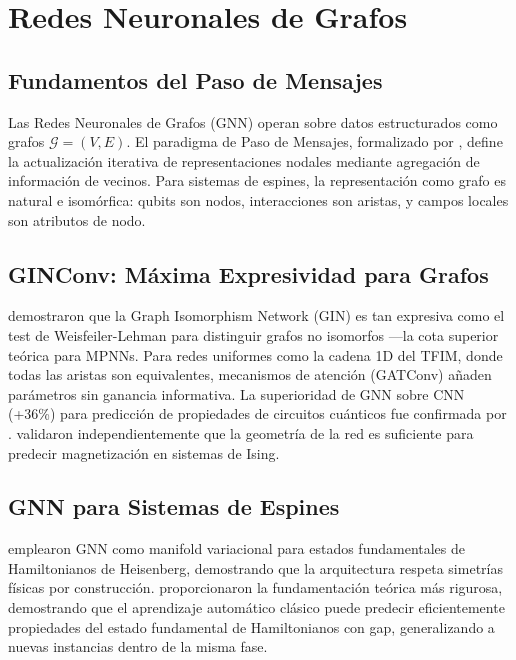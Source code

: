 \documentclass[11pt,a4paper,spanish]{book}
\begin{document}
\section{Redes Neuronales de Grafos}

\subsection{Fundamentos del Paso de Mensajes}

Las Redes Neuronales de Grafos (GNN) operan sobre datos estructurados como grafos $\mathcal{G} = (V, E)$. El paradigma de Paso de Mensajes, formalizado por \citet{gilmer2017}, define la actualización iterativa de representaciones nodales mediante agregación de información de vecinos. Para sistemas de espines, la representación como grafo es natural e isomórfica: qubits son nodos, interacciones son aristas, y campos locales son atributos de nodo.

\subsection{GINConv: Máxima Expresividad para Grafos}

\citet{xu2019} demostraron que la Graph Isomorphism Network (GIN) es tan expresiva como el test de Weisfeiler-Lehman para distinguir grafos no isomorfos ---la cota superior teórica para MPNNs. Para redes uniformes como la cadena 1D del TFIM, donde todas las aristas son equivalentes, mecanismos de atención (GATConv) añaden parámetros sin ganancia informativa. La superioridad de GNN sobre CNN (+36\%) para predicción de propiedades de circuitos cuánticos fue confirmada por \citet{meng2025}. \citet{slavin2025} validaron independientemente que la geometría de la red es suficiente para predecir magnetización en sistemas de Ising.

\subsection{GNN para Sistemas de Espines}

\citet{kochkov2021} emplearon GNN como manifold variacional para estados fundamentales de Hamiltonianos de Heisenberg, demostrando que la arquitectura respeta simetrías físicas por construcción. \citet{huang2022} proporcionaron la fundamentación teórica más rigurosa, demostrando que el aprendizaje automático clásico puede predecir eficientemente propiedades del estado fundamental de Hamiltonianos con gap, generalizando a nuevas instancias dentro de la misma fase.
\end{document}
